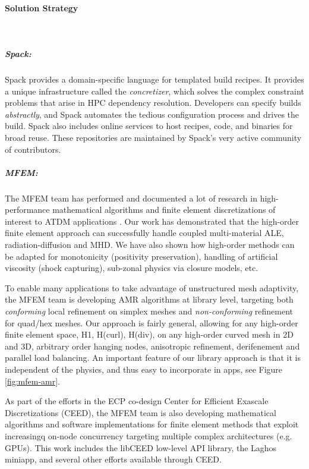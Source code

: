 \paragraph{Solution Strategy} \leavevmode \\

\subparagraph{Spack:}
Spack provides a domain-specific language for templated build recipes.
It provides a unique infrastructure called the {\it concretizer}, which
solves the complex constraint problems that arise in HPC dependency
resolution.  Developers can specify builds {\it abstractly}, and Spack
automates the tedious configuration process and drives the build. Spack
also includes online services to host recipes, code, and binaries for
broad reuse.  These repositories are maintained by Spack's very active
community of contributors.

\subparagraph{MFEM:}
The MFEM team has performed and documented a lot of research in
high-performance mathematical algorithms and finite element discretizations
of interest to ATDM applications
\cite{BLAST18,BLASTFCT18,BLASTFCT17,BLAST16,BLAST14,BLAST13,BLAST12,BLAST11}.
Our work has demonstrated that the high-order finite element approach can
successfully handle coupled multi-material ALE, radiation-diffusion and MHD.
We have also shown how high-order methods can be adapted for monotonicity
(positivity preservation), handling of artificial viscosity (shock capturing),
sub-zonal physics via closure models, etc.

To enable many applications to take advantage of unstructured mesh adaptivity,
the MFEM team is developing AMR algorithms at library level, targeting both
{\em conforming} local refinement on simplex meshes and {\em non-conforming}
refinement for quad/hex meshes. Our approach is fairly general, allowing for
any high-order finite element space, H1, H(curl), H(div), on any high-order
curved mesh in 2D and 3D, arbitrary order hanging nodes, anisotropic refinement,
derifenement and parallel load balancing.
An important feature of our library approach is that it is independent of
the physics, and thus easy to incorporate in apps, see Figure \ref{fig:mfem-amr}.

As part of the efforts in the ECP co-design Center for Efficient Exascale
Discretizations (CEED), the MFEM team is also developing mathematical algorithms
and software implementations for finite element methods that exploit increasingq
on-node concurrency targeting multiple complex architectures (e.g. GPUs). This
work includes the libCEED low-level API library, the Laghos miniapp, and several
other efforts available through CEED.

